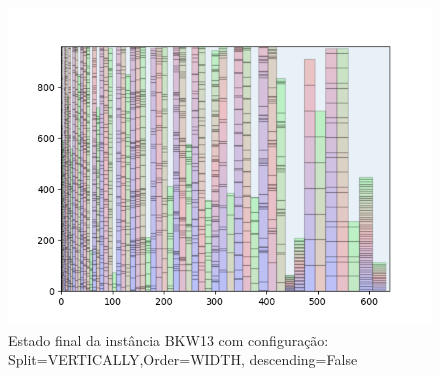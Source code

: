 \begin{figure}[H]
    \centering
    \caption[]{Estado final da instância BKW13 com configuração: Split=VERTICALLY,Order=WIDTH, descending=False}
    \label{fig:bkw13-vertically-width-false}
    \includegraphics[scale=0.5]{output/figures/bkw/bkw13/vertically/width/false/0000}
\end{figure}